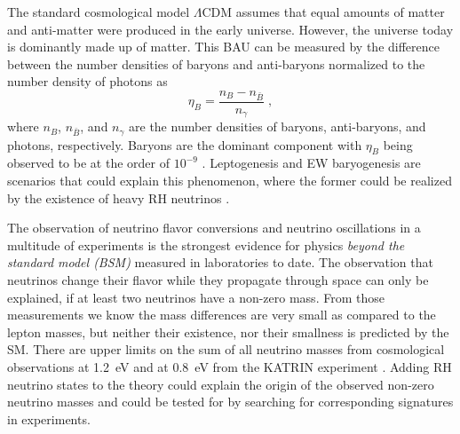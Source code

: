 The standard cosmological model $\Lambda$CDM  assumes that equal amounts of matter and anti-matter were produced in the early universe. However, the universe today is dominantly made up of matter. This BAU can be measured by the difference between the number densities of baryons and anti-baryons normalized to the number density of photons as
\begin{equation}
    \eta_B = \frac{n_B - n_{\bar{B}}}{n_\gamma}
    \;,
\end{equation}
where $n_B$, $n_{\bar{B}}$, and $n_\gamma$ are the number densities of baryons, anti-baryons, and photons, respectively. Baryons are the dominant component with  $\eta_B$ being observed to be at the order of $10^{-9}$ . Leptogenesis and EW baryogenesis are scenarios that could explain this phenomenon, where the former could be realized by the existence of heavy RH neutrinos .

The observation of neutrino flavor conversions and neutrino oscillations in a multitude of experiments  is the strongest evidence for physics \textit{beyond the standard model (BSM)} measured in laboratories to date. The observation that neutrinos change their flavor while they propagate through space can only be explained, if at least two neutrinos have a non-zero mass. From those measurements we know the mass differences are very small as compared to the lepton masses, but neither their existence, nor their smallness is predicted by the SM. There are upper limits on the sum of all neutrino masses from cosmological observations at \SI{1.2}{\electronvolt}  and at \SI{0.8}{\electronvolt} from the KATRIN experiment . Adding RH neutrino states to the theory could explain the origin of the observed non-zero neutrino masses and could be tested for by searching for corresponding signatures in experiments.




